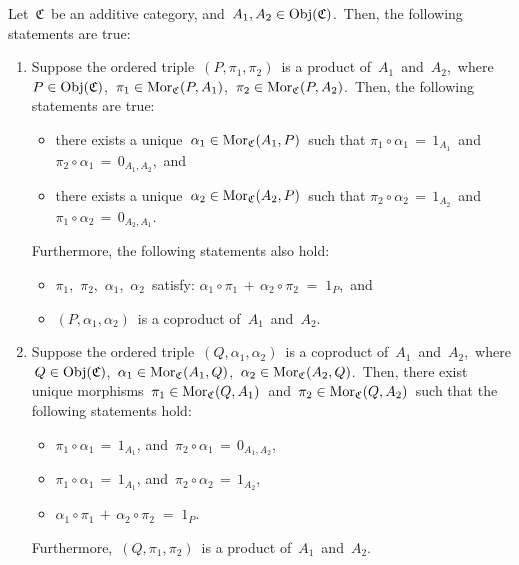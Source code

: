 \vskip 0.5cm
\begin{proposition}
\mbox{}
\vskip 0.15cm
\noindent
Let \,$\mathfrak{C}$\, be an additive category, and \,$A_{1}, A_{2} \in \textnormal{Obj}(\mathfrak{C})$.\,
Then, the following statements are true:
\begin{enumerate}
\item
	Suppose the ordered triple \,$(P,\pi_{1},\pi_{2})$\, is a product of \,$A_{1}$\, and \,$A_{2}$,\,
	where \,$P \in \textnormal{Obj}(\mathfrak{C})$, \,$\pi_{1} \in \textnormal{Mor}_{\mathfrak{C}}(P,A_{1})$, \,$\pi_{2} \in \textnormal{Mor}_{\mathfrak{C}}(P,A_{2})$.\,
	Then, the following statements are true:
	\begin{itemize}
	\item
		there exists a unique
		\,$\alpha_{1} \in \textnormal{Mor}_{\mathfrak{C}}(A_{1},P)$\,
		such that
		\;$\pi_{1} \circ \alpha_{1} \,=\, 1_{A_{1}}$\, and \;$\pi_{2} \circ \alpha_{1} \,=\, 0_{A_{1},A_{2}}$,\, and
	\item
		there exists a unique
		\,$\alpha_{2} \in \textnormal{Mor}_{\mathfrak{C}}(A_{2},P)$\,
		such that
		\;$\pi_{2} \circ \alpha_{2} \,=\, 1_{A_{2}}$\, and \;$\pi_{1} \circ \alpha_{2} \,=\, 0_{A_{2},A_{1}}$.\,
	\end{itemize}
	Furthermore, the following statements also hold:
	\begin{itemize}
	\item
		$\pi_{1}$, \,$\pi_{2}$, \,$\alpha_{1}$, \,$\alpha_{2}$\, satisfy:
		\;$\alpha_{1} \circ \pi_{1} \,+\, \alpha_{2} \circ \pi_{2} \; = \; 1_{P}$,\, and
	\item
		$(P,\alpha_{1},\alpha_{2})$\, is a coproduct of \,$A_{1}$\, and \,$A_{2}$.\,
	\end{itemize}
\item
	Suppose the ordered triple \,$(Q,\alpha_{1},\alpha_{2})$\, is a coproduct of \,$A_{1}$\, and \,$A_{2}$,\,
	where
	\,$Q \in \textnormal{Obj}(\mathfrak{C})$,
	\,$\alpha_{1} \in \textnormal{Mor}_{\mathfrak{C}}(A_{1},Q)$,
	\,$\alpha_{2} \in \textnormal{Mor}_{\mathfrak{C}}(A_{2},Q)$.\,
	Then, there {\color{red}exist unique} morphisms
	\,$\pi_{1} \in \textnormal{Mor}_{\mathfrak{C}}(Q,A_{1})$\, and \,$\pi_{2} \in \textnormal{Mor}_{\mathfrak{C}}(Q,A_{2})$\,
	such that the following statements hold:
	\begin{itemize}
	\item
		$\pi_{1} \circ \alpha_{1} \,=\, 1_{A_{1}}$,\; and \,\;$\pi_{2} \circ \alpha_{1} \,=\, 0_{A_{1},A_{2}}$,\,
	\item
		$\pi_{1} \circ \alpha_{1} \,=\, 1_{A_{1}}$,\; and \,\;$\pi_{2} \circ \alpha_{2} \,=\, 1_{A_{2}}$,\,
	\item
		$\alpha_{1} \circ \pi_{1} \,+\, \alpha_{2} \circ \pi_{2} \; = \; 1_{P}$.\,
	\end{itemize}
	Furthermore, \,$(Q,\pi_{1},\pi_{2})$\, is a product of \,$A_{1}$\, and \,$A_{2}$.\,
\end{enumerate}
\end{proposition}
